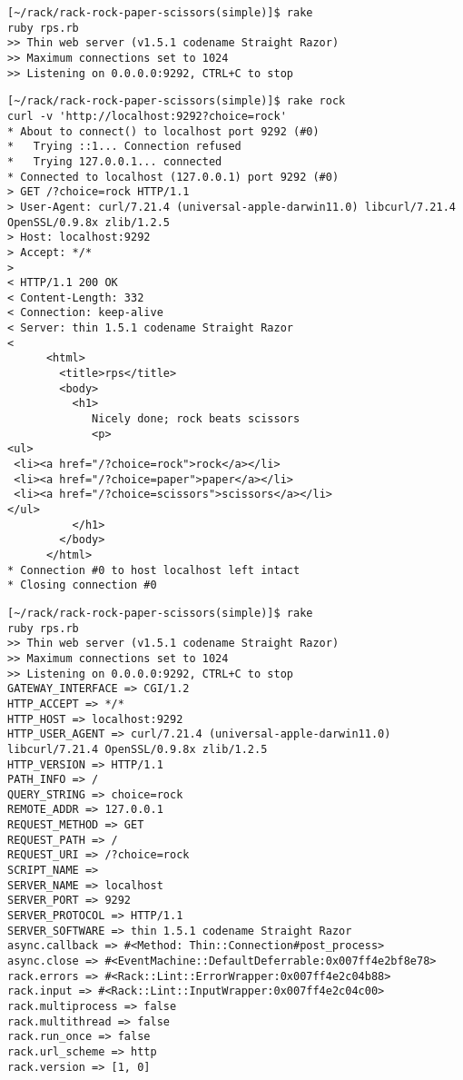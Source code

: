 \begin{verbatim}
[~/rack/rack-rock-paper-scissors(simple)]$ rake
ruby rps.rb
>> Thin web server (v1.5.1 codename Straight Razor)
>> Maximum connections set to 1024
>> Listening on 0.0.0.0:9292, CTRL+C to stop
\end{verbatim}


\begin{verbatim}
[~/rack/rack-rock-paper-scissors(simple)]$ rake rock
curl -v 'http://localhost:9292?choice=rock'
* About to connect() to localhost port 9292 (#0)
*   Trying ::1... Connection refused
*   Trying 127.0.0.1... connected
* Connected to localhost (127.0.0.1) port 9292 (#0)
> GET /?choice=rock HTTP/1.1
> User-Agent: curl/7.21.4 (universal-apple-darwin11.0) libcurl/7.21.4 OpenSSL/0.9.8x zlib/1.2.5
> Host: localhost:9292
> Accept: */*
> 
< HTTP/1.1 200 OK
< Content-Length: 332
< Connection: keep-alive
< Server: thin 1.5.1 codename Straight Razor
< 
      <html>
        <title>rps</title>
        <body>
          <h1>
             Nicely done; rock beats scissors
             <p>
<ul>
 <li><a href="/?choice=rock">rock</a></li> 
 <li><a href="/?choice=paper">paper</a></li> 
 <li><a href="/?choice=scissors">scissors</a></li> 
</ul>
          </h1>
        </body>
      </html>
* Connection #0 to host localhost left intact
* Closing connection #0
\end{verbatim}


\begin{verbatim}
[~/rack/rack-rock-paper-scissors(simple)]$ rake
ruby rps.rb
>> Thin web server (v1.5.1 codename Straight Razor)
>> Maximum connections set to 1024
>> Listening on 0.0.0.0:9292, CTRL+C to stop
GATEWAY_INTERFACE => CGI/1.2
HTTP_ACCEPT => */*
HTTP_HOST => localhost:9292
HTTP_USER_AGENT => curl/7.21.4 (universal-apple-darwin11.0) libcurl/7.21.4 OpenSSL/0.9.8x zlib/1.2.5
HTTP_VERSION => HTTP/1.1
PATH_INFO => /
QUERY_STRING => choice=rock
REMOTE_ADDR => 127.0.0.1
REQUEST_METHOD => GET
REQUEST_PATH => /
REQUEST_URI => /?choice=rock
SCRIPT_NAME => 
SERVER_NAME => localhost
SERVER_PORT => 9292
SERVER_PROTOCOL => HTTP/1.1
SERVER_SOFTWARE => thin 1.5.1 codename Straight Razor
async.callback => #<Method: Thin::Connection#post_process>
async.close => #<EventMachine::DefaultDeferrable:0x007ff4e2bf8e78>
rack.errors => #<Rack::Lint::ErrorWrapper:0x007ff4e2c04b88>
rack.input => #<Rack::Lint::InputWrapper:0x007ff4e2c04c00>
rack.multiprocess => false
rack.multithread => false
rack.run_once => false
rack.url_scheme => http
rack.version => [1, 0]
\end{verbatim}


